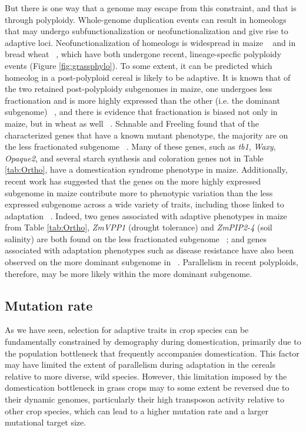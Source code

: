 \documentclass[12pt]{article}
\begin{document}
But there is one way that a genome may escape from this constraint, and that is through polyploidy. 
Whole-genome duplication events can result in homeologs that may undergo subfunctionalization or neofunctionalization and give rise to adaptive loci.
Neofunctionalization of homeologs is widespread in maize ~\citep{Hughes2014} and in bread wheat ~\citep{Pfeifer2014}, which have both undergone recent, lineage-specfic polyploidy events (Figure \ref{fig:grassphylo}).
To some extent, it can be predicted which homeolog in a post-polyploid cereal is likely to be adaptive.
It is known that of the two retained post-polyploidy subgenomes in maize, one undergoes less fractionation and is more highly expressed than the other (i.e. the dominant subgenome) ~\citep{Woodhouse2010, Schnable2011}, and there is evidence that fractionation is biased not only in maize, but in wheat as well ~\citep{Eckardt2014}.
Schnable and Freeling found that of the characterized genes that have a known mutant phenotype, the majority are on the less fractionated subgenome ~\citep{Schnable20112}.
Many of these genes, such as \textit{tb1}, \textit{Waxy}, \textit{Opaque2}, and several starch synthesis and coloration genes not in Table \ref{tab:Ortho}, have a domestication syndrome phenotype in maize.
Additionally, recent work has suggested that the genes on the more highly expressed subgenome in maize contribute more to phenotypic variation than the less expressed subgenome across a wide variety of traits, including those linked to adaptation ~\citep{RennyByfield2017}.
Indeed, two genes associated with adaptive phenotypes in maize from Table \ref{tab:Ortho}, \textit{ZmVPP1} (drought tolerance) and \textit{ZmPIP2-4} (soil salinity) are both found on the less fractionated subgenome ~\citep{Schnable20112}; and genes associated with adaptation phenotypes such as disease resistance have also been observed on the more dominant subgenome in ~\citep{RennyByfield2017}. 
Parallelism in recent polyploids, therefore, may be more likely within the more dominant subgenome.

\subsection*{Mutation rate}
As we have seen, selection for adaptive traits in crop species can be fundamentally constrained by demography during domestication, primarily due to the population bottleneck that frequently accompanies domestication.
This factor may have limited the extent of parallelism during adaptation in the cereals relative to more diverse, wild species. 
However, this limitation imposed by the domestication bottleneck in grass crops may to some extent be reversed due to their dynamic genomes, particularly their high transposon activity relative to other crop species, which can lead to a higher mutation rate and a larger mutational target size. 
\end{document}
